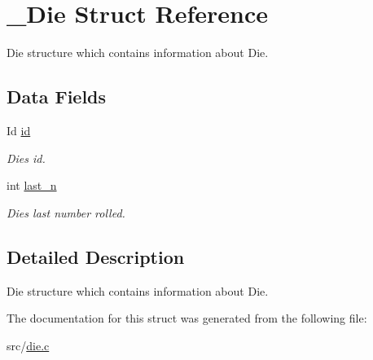 \hypertarget{struct__Die}{}\section{\+\_\+\+Die Struct Reference}
\label{struct__Die}


Die structure which contains information about Die.  


\subsection*{Data Fields}
\begin{DoxyCompactItemize}
\item 
\mbox{\label{struct__Die_a0887af562dda760409957f13619d36f1}} 
Id \hyperlink{struct__Die_a0887af562dda760409957f13619d36f1}{id}
\begin{DoxyCompactList}\small\item\em Die\textquotesingle{}s id. \end{DoxyCompactList}\item 
\mbox{\label{struct__Die_abf73744a544920c64d79d84d964be62d}} 
int \hyperlink{struct__Die_abf73744a544920c64d79d84d964be62d}{last\+\_\+n}
\begin{DoxyCompactList}\small\item\em Die\textquotesingle{}s last number rolled. \end{DoxyCompactList}\end{DoxyCompactItemize}


\subsection{Detailed Description}
Die structure which contains information about Die. 

The documentation for this struct was generated from the following file\+:\begin{DoxyCompactItemize}
\item 
src/\hyperlink{die_8c}{die.\+c}\end{DoxyCompactItemize}
